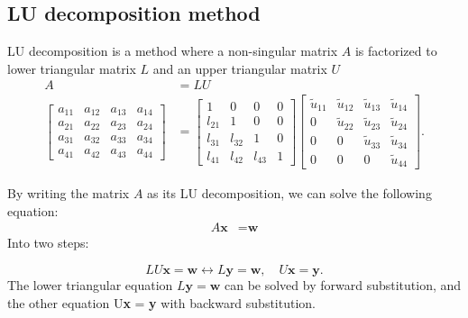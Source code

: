 \documentclass{article}
\begin{document}
\subsection{LU decomposition method}

LU decomposition is a method where a non-singular matrix ${A}$ is factorized to lower triangular matrix ${L}$ and an upper triangular matrix ${U}$
\begin{align*}
  {A} &= {L}{U} \\
  \begin{bmatrix}
      a_{11} & a_{12} & a_{13}  & a_{14}   \\
      a_{21} & a_{22} & a_{23} & a_{24}   \\
      a_{31} & a_{32} & a_{33} & a_{34} \\
      a_{41} & a_{42} & a_{43} & a_{44}
  \end{bmatrix}
  &=
    \begin{bmatrix}
      1 & 0 & 0   & 0   \\
      l_{21} & 1 & 0 & 0   \\
      l_{31} & l_{32} & 1 & 0 \\
      l_{41} & l_{42} & l_{43} & 1
  \end{bmatrix}
    \begin{bmatrix}
      \tilde{u}_{11} & \tilde{u}_{12} & \tilde{u}_{13}  & \tilde{u}_{14}   \\
      0 & \tilde{u}_{22} & \tilde{u}_{23} & \tilde{u}_{24}   \\
      0   & 0 & \tilde{u}_{33} & \tilde{u}_{34} \\
      0   & 0   & 0 & \tilde{u}_{44}
  \end{bmatrix}.
\end{align*}

By writing the matrix ${A}$ as its LU decomposition, we can solve the following equation:
\begin{align*}
 {A}\textbf{x} &= \textbf{w}
\end{align*}
Into two steps:

\begin{equation}
{L}{U}\textbf{x} = \textbf{w}\leftrightarrow   {L}\textbf{y} = \textbf{w}, \quad  {U}\textbf{x} = \textbf{y}.
\end{equation}
The lower triangular equation ${L}\textbf{y} = \textbf{w}$ can be solved by forward substitution, and the other equation {U}\textbf{x} = \textbf{y} with backward substitution.\\
\end{document}
